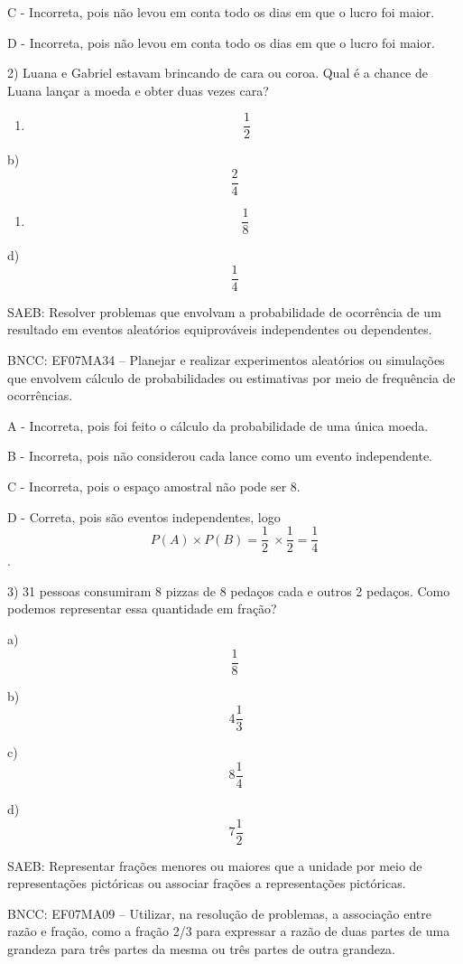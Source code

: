 C - Incorreta, pois não levou em conta todo os dias em que o lucro foi
maior.

D - Incorreta, pois não levou em conta todo os dias em que o lucro foi
maior.

2) Luana e Gabriel estavam brincando de cara ou coroa. Qual é a chance
de Luana lançar a moeda e obter duas vezes cara?

\begin{enumerate}
\def\labelenumi{\alph{enumi})}
\tightlist
\item
  \[\ \frac{1}{2}\]
\end{enumerate}

b) \[\frac{2}{4}\]

\begin{enumerate}
\def\labelenumi{\alph{enumi})}
\setcounter{enumi}{2}
\tightlist
\item
  \[\frac{1}{8}\]
\end{enumerate}

d) \[\frac{1}{4}\]

SAEB: Resolver problemas que envolvam a probabilidade de ocorrência de
um resultado em eventos aleatórios equiprováveis independentes ou
dependentes.

BNCC: EF07MA34 -- Planejar e realizar experimentos aleatórios ou
simulações que envolvem cálculo de probabilidades ou estimativas por
meio de frequência de ocorrências.

A - Incorreta, pois foi feito o cálculo da probabilidade de uma única
moeda.

B - Incorreta, pois não considerou cada lance como um evento
independente.

C - Incorreta, pois o espaço amostral não pode ser 8.

D - Correta, pois são eventos independentes, logo
\[P\left( A \right) \times P\left( B \right) = \frac{1}{2}\  \times \frac{1}{2} = \frac{1}{4}\].

3) 31 pessoas consumiram 8 pizzas de 8 pedaços cada e outros 2 pedaços.
Como podemos representar essa quantidade em fração?

a) \[\frac{1}{8}\]

b) \[\ 4\frac{1}{3}\]

c) \[\ 8\frac{1}{4}\]

d) \[\ 7\frac{1}{2}\]

SAEB: Representar frações menores ou maiores que a unidade por meio de
representações pictóricas ou associar frações a representações
pictóricas.

BNCC: EF07MA09 -- Utilizar, na resolução de problemas, a associação
entre razão e fração, como a fração 2/3 para expressar a razão de duas
partes de uma grandeza para três partes da mesma ou três partes de outra
grandeza.

